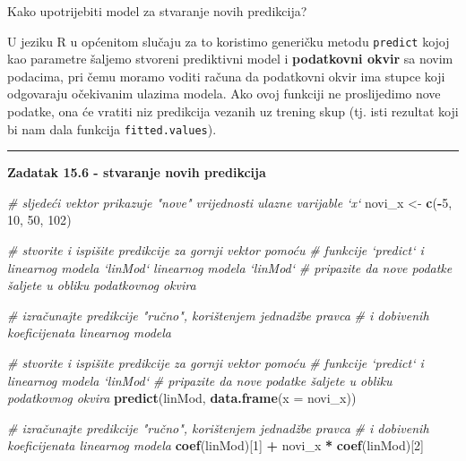 \documentclass[]{book}
\newenvironment{Shaded}{\begin{snugshade}}{\end{snugshade}}
\newcommand{\KeywordTok}[1]{\textcolor[rgb]{0.13,0.29,0.53}{\textbf{#1}}}
\newcommand{\DataTypeTok}[1]{\textcolor[rgb]{0.13,0.29,0.53}{#1}}
\newcommand{\DecValTok}[1]{\textcolor[rgb]{0.00,0.00,0.81}{#1}}
\newcommand{\StringTok}[1]{\textcolor[rgb]{0.31,0.60,0.02}{#1}}
\newcommand{\CommentTok}[1]{\textcolor[rgb]{0.56,0.35,0.01}{\textit{#1}}}
\newcommand{\OperatorTok}[1]{\textcolor[rgb]{0.81,0.36,0.00}{\textbf{#1}}}
\newcommand{\NormalTok}[1]{#1}
\theoremstyle{definition}
\theoremstyle{definition}
\theoremstyle{definition}
\theoremstyle{remark}
\begin{document}
Kako upotrijebiti model za stvaranje novih predikcija?

U jeziku R u općenitom slučaju za to koristimo generičku metodu
\texttt{predict} kojoj kao parametre šaljemo stvoreni prediktivni model
i \textbf{podatkovni okvir} sa novim podacima, pri čemu moramo voditi
računa da podatkovni okvir ima stupce koji odgovaraju očekivanim ulazima
modela. Ako ovoj funkciji ne proslijedimo nove podatke, ona će vratiti
niz predikcija vezanih uz trening skup (tj. isti rezultat koji bi nam
dala funkcija \texttt{fitted.values}).

\begin{center}\rule{0.5\linewidth}{\linethickness}\end{center}

\textbf{Zadatak 15.6 - stvaranje novih predikcija}

\begin{Shaded}
\begin{Highlighting}[]
\CommentTok{# sljedeći vektor prikazuje "nove" vrijednosti ulazne varijable `x`}
\NormalTok{novi_x <-}\StringTok{ }\KeywordTok{c}\NormalTok{(}\OperatorTok{-}\DecValTok{5}\NormalTok{, }\DecValTok{10}\NormalTok{, }\DecValTok{50}\NormalTok{, }\DecValTok{102}\NormalTok{)}

\CommentTok{# stvorite i ispišite predikcije za gornji vektor pomoću }
\CommentTok{# funkcije `predict` i linearnog modela `linMod` linearnog modela `linMod`}
\CommentTok{# pripazite da nove podatke šaljete u obliku podatkovnog okvira}


\CommentTok{# izračunajte predikcije "ručno", korištenjem jednadžbe pravca}
\CommentTok{# i dobivenih koeficijenata linearnog modela}
\end{Highlighting}
\end{Shaded}

\begin{Shaded}
\begin{Highlighting}[]
\CommentTok{# stvorite i ispišite predikcije za gornji vektor pomoću }
\CommentTok{# funkcije `predict` i linearnog modela `linMod`}
\CommentTok{# pripazite da nove podatke šaljete u obliku podatkovnog okvira}
\KeywordTok{predict}\NormalTok{(linMod, }\KeywordTok{data.frame}\NormalTok{(}\DataTypeTok{x =}\NormalTok{ novi_x))}

\CommentTok{# izračunajte predikcije "ručno", korištenjem jednadžbe pravca}
\CommentTok{# i dobivenih koeficijenata linearnog modela}
\KeywordTok{coef}\NormalTok{(linMod)[}\DecValTok{1}\NormalTok{] }\OperatorTok{+}\StringTok{ }\NormalTok{novi_x }\OperatorTok{*}\StringTok{ }\KeywordTok{coef}\NormalTok{(linMod)[}\DecValTok{2}\NormalTok{] }
\end{Highlighting}
\end{Shaded}
\end{document}
